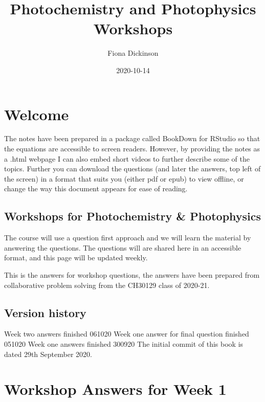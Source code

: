 \documentclass[
]{book}
\title{Photochemistry and Photophysics Workshops}
\author{Fiona Dickinson}
\date{2020-10-14}
\begin{document}
\maketitle

{
\setcounter{tocdepth}{1}
\tableofcontents
}
\hypertarget{welcome}{%
\chapter*{Welcome}\label{welcome}}

The notes have been prepared in a package called BookDown for RStudio so that the equations are accessible to screen readers. However, by providing the notes as a .html webpage I can also embed short videos to further describe some of the topics. Further you can download the questions (and later the answers, top left of the screen) in a format that suits you (either pdf or epub) to view offline, or change the way this document appears for ease of reading.

\hypertarget{workshops-for-photochemistry-photophysics}{%
\section*{Workshops for Photochemistry \& Photophysics}\label{workshops-for-photochemistry-photophysics}}

The course will use a question first approach and we will learn the material by answering the questions. The questions will are shared here in an accessible format, and this page will be updated weekly.

This is the answers for workshop questions, the answers have been prepared from collaborative problem solving from the CH30129 class of 2020-21.

\hypertarget{version-history}{%
\section*{Version history}\label{version-history}}

Week two answers finished 061020
Week one answer for final question finished 051020
Week one answers finished 300920
The initial commit of this book is dated 29th September 2020.

\hypertarget{ch:Workshop1}{%
\chapter{Workshop Answers for Week 1}\label{ch:Workshop1}}
\end{document}

